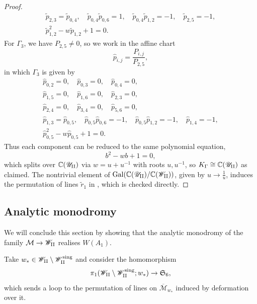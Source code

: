 \documentclass[a4paper,reqno]{amsart}
\numberwithin{equation}{section}
\newcommand{\C}{\mathbb{C}}
\numberwithin{equation}{section}
\begin{document}
\begin{proof}
\begin{equation*}
\begin{gathered}
    \tilde{p}_{2,3}=\tilde{p}_{0,4}, \quad 
    \tilde{p}_{0,4} \tilde{p}_{0,6}=1, \quad
\tilde{p}_{0,4} \tilde{p}_{1,2}=-1, \quad 
\tilde{p}_{2,5}=-1, \\
\tilde{p}_{1,2}^2 - w \tilde{p}_{1,2} + 1=0.
\end{gathered}    
\end{equation*} 
For $\Gamma_3$, we have $P_{2,5}\neq 0$, so we work in the affine chart 
$$\hat{p}_{i,j}=\frac{P_{i,j}}{P_{2,5}},$$ 
in which $\Gamma_3$ is given by 
\begin{equation*}
    \begin{gathered}
    \hat{p}_{0,2}=0, \quad \hat{p}_{0,3}=0, \quad \hat{p}_{0,4}=0, \\
    \hat{p}_{1,5}=0, \quad \hat{p}_{1,6}=0, \quad \hat{p}_{2,3}=0, \\
    \hat{p}_{2,4}=0, \quad \hat{p}_{3,4}=0, \quad \hat{p}_{5,6}=0,\\
    \hat{p}_{1,3}=\hat{p}_{0,5}, \quad 
    \hat{p}_{0,5} \hat{p}_{0,6}=-1, \quad 
    \hat{p}_{0,5} \hat{p}_{1,2}=-1, \quad 
    \hat{p}_{1,4}=-1, \\
\hat{p}_{0,5}^2- w \hat{p}_{0,5}+1=0.
    \end{gathered}
\end{equation*}
Thus each component can be reduced to the same polynomial equation, 
$$ b^2 - w b + 1=0,$$
which splits over $\C(\mathscr{U}_{\rm{II}})$ via $w=u+u^{-1}$ with roots $u,u^{-1}$, so $K_{\Gamma}\cong \C(\mathscr{U}_{\rm{II}})$ as claimed.
The nontrivial element of $\operatorname{Gal}(\C(\mathscr{U}_{\rm{II}})/\C(\mathscr{W}_{\rm{II}}))$, given by $u\to\frac{1}{u}$, induces the permutation of lines $\tilde{r}_1$ in , which is checked directly.
\end{proof}




\subsection{Analytic monodromy}


We will conclude this section by showing that the analytic monodromy of the family $\mathcal{M}\to\mathscr{W}_{\rm{II}}$ realises $W(A_1)$.

Take $w_* \in \mathscr{W}_{\rm{II}}\setminus \mathscr{W}_{\rm{II}}^{\operatorname{sing}}$ and consider the homomorphism
\begin{equation} \label{eq:monodromyhomPII}
    \pi_1(\mathscr{W}_{\rm{II}}\setminus \mathscr{W}_{\rm{II}}^{\operatorname{sing}} ; w_*) \to \mathfrak{S}_{6},
\end{equation}
which sends a loop to the permutation of lines on $\overline{\mathcal{M}}_{w_*}$ induced by deformation over it.
\end{document}
